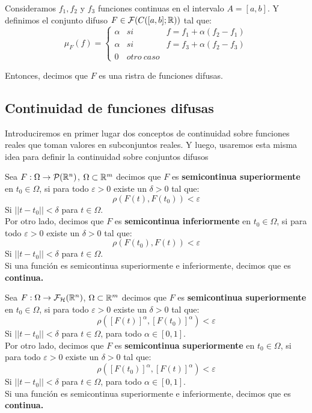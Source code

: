 \begin{ejemplo}
	Consideramos $f_1, f_2$ y $f_3$ funciones continuas en el intervalo $A=[a, b]$. Y definimos el conjunto difuso $F \in \mathcal{F}(C([a, b]; \mathbb R))$ tal que:
	\[
		\mu_F(f) = \left\{
			\begin{array}{ccc}
				\alpha & si & f = f_1 + \alpha(f_2 - f_1) \\
				\alpha & si & f = f_3 + \alpha(f_2 - f_3) \\
				0 & otro~caso & 
			\end{array}
		\right.
	\]
	
	Entonces, decimos que $F$ es una ristra de funciones difusas.
\end{ejemplo}

\fi

\subsection{Continuidad de funciones difusas}
Introduciremos en primer lugar dos conceptos de continuidad sobre funciones reales que toman valores en subconjuntos reales. Y luego, usaremos esta misma idea para definir la continuidad sobre conjuntos difusos

\begin{definicion}
	\label{def:funcioncontinua}
	Sea $F : \Omega \rightarrow \mathcal{P}(\mathbb R^n)$, $\Omega \subset \mathbb R^m$ decimos que $F$ es \textbf{semicontinua superiormente} en $t_0 \in \Omega$, si para todo $\varepsilon>0$ existe un $\delta>0$ tal que:
	\[
		\rho(F(t), F(t_0))<\varepsilon
	\]
	Si $||t-t_0||<\delta$ para $t \in \Omega$. \\
	Por otro lado, decimos que $F$  es \textbf{semicontinua inferiormente} en $t_0 \in \Omega$, si para todo $\varepsilon>0$ existe un $\delta>0$ tal que:
	\[
	\rho(F(t_0), F(t))<\varepsilon
	\]
	Si $||t-t_0||<\delta$ para $t \in \Omega$. \\
	Si una función es semicontinua superiormente e inferiormente, decimos que es \textbf{continua.}
\end{definicion}

\begin{definicion}
	Sea $F : \Omega \rightarrow \mathcal{F}_\mathcal{H}(\mathbb R^n)$, $\Omega \subset \mathbb R^m$ decimos que $F$ es \textbf{semicontinua superiormente} en $t_0 \in \Omega$, si para todo $\varepsilon>0$ existe un $\delta>0$ tal que:
	\[
	\rho([F(t)]^\alpha, [F(t_0)]^\alpha)<\varepsilon
	\]
	Si $||t-t_0||<\delta$ para $t \in \Omega$, para todo $\alpha \in [0, 1]$. \\
	Por otro lado, decimos que $F$ es \textbf{semicontinua superiormente} en $t_0 \in \Omega$, si para todo $\varepsilon>0$ existe un $\delta>0$ tal que:
	\[
	\rho([F(t_0)]^\alpha, [F(t)]^\alpha)<\varepsilon
	\]
	Si $||t-t_0||<\delta$ para $t \in \Omega$, para todo $\alpha \in [0, 1]$. \\
	Si una función es semicontinua superiormente e inferiormente, decimos que es \textbf{continua.}
\end{definicion}

